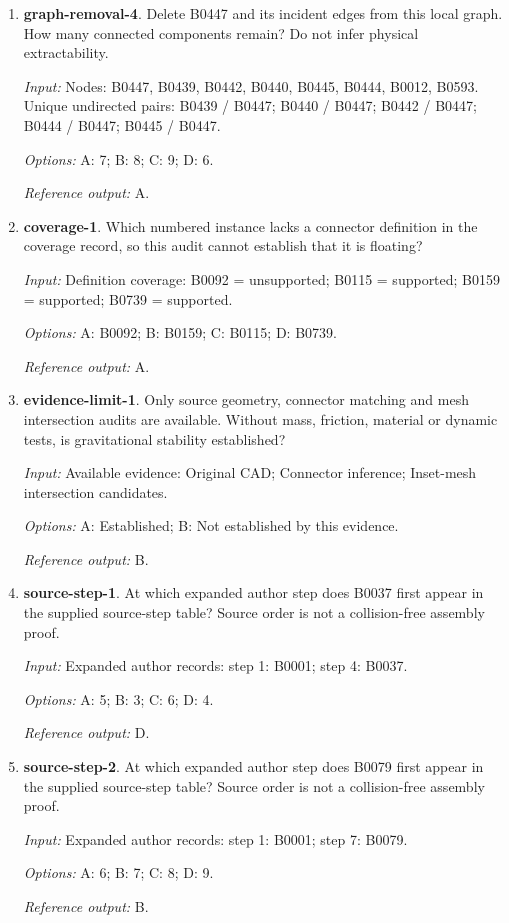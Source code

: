\begin{enumerate}
\item \textbf{graph-removal-4}. Delete B0447 and its incident edges from this local graph. How many connected components remain? Do not infer physical extractability.\par {\small \textit{Input:} Nodes: B0447, B0439, B0442, B0440, B0445, B0444, B0012, B0593. Unique undirected pairs: B0439 / B0447; B0440 / B0447; B0442 / B0447; B0444 / B0447; B0445 / B0447. \par\textit{Options:} A: 7; B: 8; C: 9; D: 6. \par\textit{Reference output:} A.}
\item \textbf{coverage-1}. Which numbered instance lacks a connector definition in the coverage record, so this audit cannot establish that it is floating?\par {\small \textit{Input:} Definition coverage: B0092 = unsupported; B0115 = supported; B0159 = supported; B0739 = supported. \par\textit{Options:} A: B0092; B: B0159; C: B0115; D: B0739. \par\textit{Reference output:} A.}
\item \textbf{evidence-limit-1}. Only source geometry, connector matching and mesh intersection audits are available. Without mass, friction, material or dynamic tests, is gravitational stability established?\par {\small \textit{Input:} Available evidence: Original CAD; Connector inference; Inset-mesh intersection candidates. \par\textit{Options:} A: Established; B: Not established by this evidence. \par\textit{Reference output:} B.}
\item \textbf{source-step-1}. At which expanded author step does B0037 first appear in the supplied source-step table? Source order is not a collision-free assembly proof.\par {\small \textit{Input:} Expanded author records: step 1: B0001; step 4: B0037. \par\textit{Options:} A: 5; B: 3; C: 6; D: 4. \par\textit{Reference output:} D.}
\item \textbf{source-step-2}. At which expanded author step does B0079 first appear in the supplied source-step table? Source order is not a collision-free assembly proof.\par {\small \textit{Input:} Expanded author records: step 1: B0001; step 7: B0079. \par\textit{Options:} A: 6; B: 7; C: 8; D: 9. \par\textit{Reference output:} B.}

\end{enumerate}
